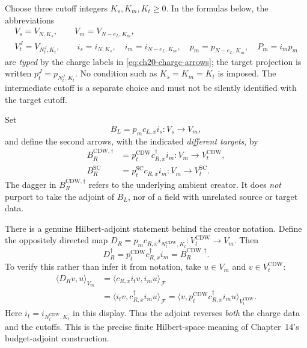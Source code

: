 Choose three cutoff integers \(K_s,K_m,K_t\geq0\).  In the formulas
below, the abbreviations
\begin{equation}
\begin{gathered}
 V_s=V_{N,K_s},\qquad V_m=V_{N-e_L,K_m},\\
 V_t^{J}=V_{N_t^{J},K_t},\qquad
 i_s=i_{N,K_s},\quad i_m=i_{N-e_L,K_m},\quad
 p_m=p_{N-e_L,K_m},\quad P_m=i_mp_m
\end{gathered}
\label{eq:ch20-three-carriers}
\end{equation}
are \emph{typed} by the charge labels in
\eqref{eq:ch20-charge-arrows}; the target projection is written
\(p_t^J=p_{N_t^J,K_t}\).  No condition such as
\(K_s=K_m=K_t\) is imposed.  The intermediate cutoff is a separate
choice and must not be silently identified with the target cutoff.

\begin{definition}
\label{def:ch20-field-arrows}
Set
\begin{equation}
 B_L=p_m c_{L,x}i_s:V_s\longrightarrow V_m,
 \label{eq:ch20-BL}
\end{equation}
and define the second arrows, with the indicated \emph{different targets},
by
\begin{align}
 B_R^{\mathrm{CDW},\dagger}
   &=p_t^{\mathrm{CDW}}c_{R,x}^{\dagger}i_m:
         V_m\longrightarrow V_t^{\mathrm{CDW}},
 \label{eq:ch20-BR-CDW}\\
 B_R^{\mathrm{SC}}
   &=p_t^{\mathrm{SC}}c_{R,x}i_m:
         V_m\longrightarrow V_t^{\mathrm{SC}}.
 \label{eq:ch20-BR-SC}
\end{align}
The dagger in \(B_R^{\mathrm{CDW},\dagger}\) refers to the underlying
ambient creator.  It does \emph{not} purport to take the adjoint of
\(B_L\), nor of a field with unrelated source or target data.
\end{definition}

There is a genuine Hilbert-adjoint statement behind the creator notation.
Define the oppositely directed map
\(D_R=p_m c_{R,x}i_{N_t^{\mathrm{CDW}},K_t}:
V_t^{\mathrm{CDW}}\to V_m\).  Then
\begin{equation}
 D_R^{\dagger}
   =p_t^{\mathrm{CDW}}c_{R,x}^{\dagger}i_m
   =B_R^{\mathrm{CDW},\dagger}.
 \label{eq:ch20-reversed-adjoint}
\end{equation}
To verify this rather than infer it from notation, take
\(u\in V_m\) and \(v\in V_t^{\mathrm{CDW}}\):
\begin{align*}
 \langle D_Rv,u\rangle_{V_m}
 &=\langle c_{R,x}i_tv,i_mu\rangle_{\mathcal F}\\
 &=\langle i_tv,c_{R,x}^{\dagger}i_mu\rangle_{\mathcal F}
  =\langle v,p_t^{\mathrm{CDW}}c_{R,x}^{\dagger}i_mu\rangle_{V_t^{\mathrm{CDW}}}.
\end{align*}
Here \(i_t=i_{N_t^{\mathrm{CDW}},K_t}\) in this display.
Thus the adjoint reverses \emph{both} the charge data and the cutoffs.
This is the precise finite Hilbert-space meaning of Chapter~14's
budget-adjoint construction.

